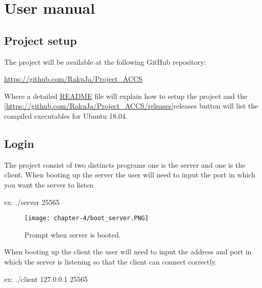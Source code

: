 
\chapter{User manual}
\label{cap:user-manual}

\section{Project setup}

The project will be available at the following GitHub repository: \newline{}
\centerline{\href{https://github.com/RakuJa/Project\_ACCS}{https://github.com/RakuJa/Project\_ACCS}} \newline{}
Where a detailed \href{https://github.com/RakuJa/Project_ACCS/blob/main/README.MD}{README} file will explain how to setup the project and the \ref{https://github.com/RakuJa/Project_ACCS/releases}{releases} button will list the compiled executables for Ubuntu 18.04.

\section{Login}

The project consist of two distincts programs one is the server and one is the client.
When booting up the server the user will need to input the port in which you want the server to listen \newline{}
\centerline{ex: ./server 25565} \newline{}

\begin{figure}[!h] 
    \centering 
    \texttt{[image: chapter-4/boot\_server.PNG]} 
    \caption{Prompt when server is booted.}
    \label{fig:booted_server_prompt}
\end{figure}
When booting up the client the user will need to input the address and port in which the server is listening so that the client can connect correctly. \newline{}
\centerline{ex: ./client 127.0.0.1 25565} \newline{}

